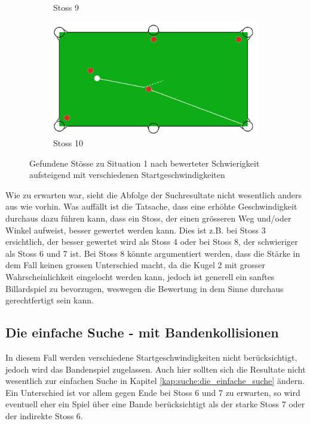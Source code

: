 \begin{figure}[h!]
\begin{subfigure}[b]{0.3\textwidth}
        \caption{Stoss 9}
        \label{fig:situation_velocity_1_solution_9}
    \end{subfigure}
    \hfill
    \begin{subfigure}[b]{0.3\textwidth}
        \centering
        \includegraphics[width=1.0\linewidth]{../common/04_results/resources/simple_search/situation_diverse_solution_velocity_10.PNG}
        \caption{Stoss 10}
        \label{fig:situation_velocity_1_solution_10}
    \end{subfigure}
    \caption{Gefundene Stösse zu Situation 1 nach bewerteter Schwierigkeit aufsteigend mit verschiedenen Startgeschwindigkeiten}
    \label{fig:situation_1_solutions_startgeschwindigkeit}
\end{figure}

Wie zu erwarten war, sieht die Abfolge der Suchresultate nicht wesentlich anders aus wie vorhin. Was auffällt ist die Tatsache,
dass eine erhöhte Geschwindigkeit durchaus dazu führen kann, dass ein Stoss, der einen grösseren Weg und/oder Winkel aufweist,
besser gewertet werden kann. Dies ist z.B. bei Stoss 3 ersichtlich, der besser gewertet wird als Stoss 4 oder bei
Stoss 8, der schwieriger als Stoss 6 und 7 ist. Bei Stoss 8 könnte argumentiert werden, dass die Stärke
in dem Fall keinen grossen Unterschied macht, da die Kugel 2 mit grosser Wahrscheinlichkeit eingelocht werden kann,
jedoch ist generell ein sanftes Billardspiel zu bevorzugen, weswegen die Bewertung in dem Sinne durchaus gerechtfertigt
sein kann.

\newpage

\subsection{Die einfache Suche - mit Bandenkollisionen}
In diesem Fall werden verschiedene Startgeschwindigkeiten nicht berücksichtigt, jedoch wird das Bandenspiel zugelassen.
Auch hier sollten sich die Resultate nicht wesentlich zur einfachen Suche in Kapitel \ref{kap:suche:die_einfache_suche} ändern.
Ein Unterschied ist vor allem gegen Ende bei Stoss 6 und 7 zu erwarten, so wird eventuell eher ein Spiel über eine Bande berücksichtigt
als der starke Stoss 7 oder der indirekte Stoss 6.

